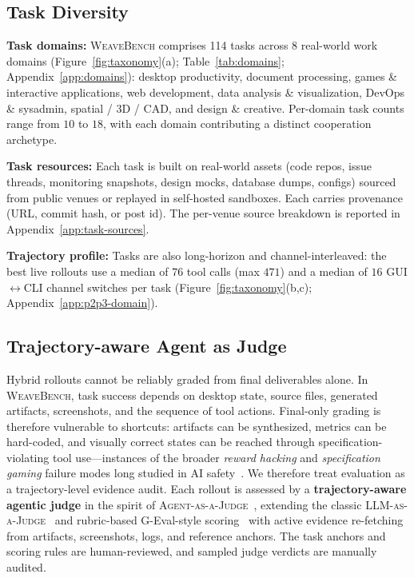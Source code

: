 \documentclass{llmxive}
\providecommand{\Eyeson}{\textsc{WeaveBench}\xspace}
\begin{document}
\subsection{Task Diversity}
\label{sec:diversity}

\noindent\textbf{Task domains:} \Eyeson{} comprises 114 tasks across 8 real-world work domains (Figure~\ref{fig:taxonomy}(a); Table~\ref{tab:domains}; Appendix~\ref{app:domains}): desktop productivity, document processing, games \& interactive applications, web development, data analysis \& visualization, DevOps \& sysadmin, spatial / 3D / CAD, and design \& creative. Per-domain task counts range from $10$ to $18$, with each domain contributing a distinct cooperation archetype.

\noindent\textbf{Task resources:} Each task is built on real-world assets (code repos, issue threads, monitoring snapshots, design mocks, database dumps, configs) sourced from public venues or replayed in self-hosted sandboxes. Each carries provenance (URL, commit hash, or post id).
The per-venue source breakdown is reported in Appendix~\ref{app:task-sources}.

\noindent\textbf{Trajectory profile:} Tasks are also long-horizon and channel-interleaved: the best live rollouts use a median of $76$ tool calls (max $471$) and a median of $16$ GUI$\leftrightarrow$CLI channel switches per task (Figure~\ref{fig:taxonomy}(b,c); Appendix~\ref{app:p2p3-domain}).

\subsection{Trajectory-aware Agent as Judge}
\label{sec:grader}

Hybrid rollouts cannot be reliably graded from final deliverables alone. In \textsc{WeaveBench}, task success depends on desktop state, source files, generated artifacts, screenshots, and the sequence of tool actions. Final-only grading is therefore vulnerable to shortcuts: artifacts can be synthesized, metrics can be hard-coded, and visually correct states can be reached through specification-violating tool use---instances of the broader \emph{reward hacking} and \emph{specification gaming} failure modes long studied in AI safety~\citep{amodei2016concrete,krakovna2020specgaming}. We therefore treat evaluation as a trajectory-level evidence audit. Each rollout is assessed by a \textbf{trajectory-aware agentic judge} in the spirit of \textsc{Agent-as-a-Judge}~\citep{zhuge2024agentasjudge}, extending the classic \textsc{LLM-as-a-Judge}~\citep{zheng2023llmjudge} and rubric-based G-Eval-style scoring~\citep{liu2023geval} with active evidence re-fetching from artifacts, screenshots, logs, and reference anchors. The task anchors and scoring rules are human-reviewed, and sampled judge verdicts are manually audited.
\end{document}
